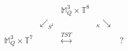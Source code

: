 \begin{equation*}
\begin{array}{ccccc}
&  & \mathbb{M}_{Q}^{3}\times \mathbb{T}^{8} &  &  \\ 
& \swarrow _{S^{1}} &  & _{\kappa }\searrow  &  \\ 
\mathbb{M}_{Q}^{3}\times \mathbb{T}^{7} &  & \overset{TST}{\longleftrightarrow }
&  & ?
\end{array}
\end{equation*}

